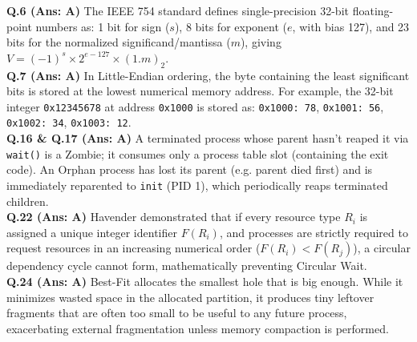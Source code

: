 \begin{solutionbox}
\textbf{Q.6 (Ans: A)} The IEEE 754 standard defines single-precision 32-bit floating-point numbers as: 1 bit for sign ($s$), 8 bits for exponent ($e$, with bias 127), and 23 bits for the normalized significand/mantissa ($m$), giving $V = (-1)^s \times 2^{e-127} \times (1.m)_2$.\\[2mm]
\textbf{Q.7 (Ans: A)} In Little-Endian ordering, the byte containing the least significant bits is stored at the lowest numerical memory address. For example, the 32-bit integer \texttt{0x12345678} at address \texttt{0x1000} is stored as: \texttt{0x1000: 78}, \texttt{0x1001: 56}, \texttt{0x1002: 34}, \texttt{0x1003: 12}.\\[2mm]
\textbf{Q.16 \& Q.17 (Ans: A)} A terminated process whose parent hasn't reaped it via \texttt{wait()} is a Zombie; it consumes only a process table slot (containing the exit code). An Orphan process has lost its parent (e.g. parent died first) and is immediately reparented to \texttt{init} (PID 1), which periodically reaps terminated children.\\[2mm]
\textbf{Q.22 (Ans: A)} Havender demonstrated that if every resource type $R_i$ is assigned a unique integer identifier $F(R_i)$, and processes are strictly required to request resources in an increasing numerical order ($F(R_i) < F(R_j)$), a circular dependency cycle cannot form, mathematically preventing Circular Wait.\\[2mm]
\textbf{Q.24 (Ans: A)} Best-Fit allocates the smallest hole that is big enough. While it minimizes wasted space in the allocated partition, it produces tiny leftover fragments that are often too small to be useful to any future process, exacerbating external fragmentation unless memory compaction is performed.
\end{solutionbox}

\newpage

